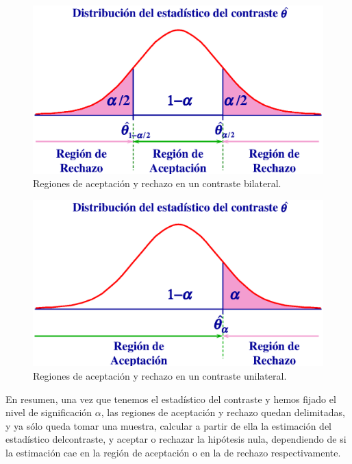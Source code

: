 \begin{figure}[h!]
\begin{center}
\includegraphics[scale=0.5]{contrastes/regionesbilateral}
\caption{Regiones de aceptación y rechazo en un contraste
bilateral.}\label{g:regiones_contraste_bilateral}
\end{center}
\end{figure}

\begin{figure}[h!]
\begin{center}
\includegraphics[scale=0.5]{contrastes/regionesunilateral}
\caption{Regiones de aceptación y rechazo en un contraste
unilateral.}\label{g:regiones_contraste_unilateral}
\end{center}
\end{figure}

En resumen, una vez que tenemos el estadístico del contraste y hemos fijado el
nivel de significación $\alpha$, las regiones de aceptación y rechazo quedan
delimitadas, y ya sólo queda tomar una muestra, calcular a partir de ella la 
estimación del estadístico delcontraste, y aceptar o rechazar la hipótesis 
nula, dependiendo de si la estimación cae en la región de aceptación o en la de rechazo 
respectivamente.



